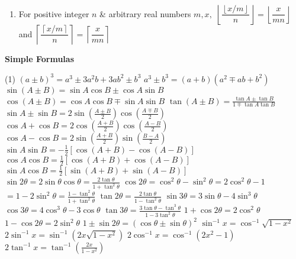 \documentclass[10pt,a4paper,landscape]{article}
\begin{document}
\begin{multicols*}{3}
\begin{enumerate}
			\item For positive integer $n$ \& arbitrary real numbers $m, x,$ \newline $\left \lfloor \dfrac{\left \lfloor x/m \right \rfloor}{n} \right \rfloor = \left \lfloor \dfrac{x}{mn} \right \rfloor$ and $\left \lceil \dfrac{\left \lceil x/m \right \rceil}{n} \right \rceil = \left \lceil \dfrac{x}{mn} \right \rceil$
			
		\end{enumerate}
		
		
		
		\noindent \textbf{Simple Formulas}
		\vspace{-.15 cm}
		\begin{tasks}(1)
			\task $(a \pm b)^3 = a^3 \pm 3a^2b + 3ab^2 \pm b^3$
			\task $a^3 \pm b^3 = (a+b)(a^2 \mp ab + b^2)$
			\task $\sin(A \pm B) = \sin A \cos B \pm \cos A \sin B$
			\task $\cos(A \pm B) = \cos A \cos B \mp \sin A \sin B$
			\task $\tan(A \pm B) = \frac{\tan A \pm \tan B}{1 \mp \tan A \tan B}$
			\task $\sin A \pm \sin B = 2\sin\left(\frac{A \pm B}{2}\right)\cos\left(\frac{A \mp B}{2}\right)$
			\task $\cos A + \cos B = 2\cos\left(\frac{A+B}{2}\right)\cos\left(\frac{A-B}{2}\right)$
			\task $\cos A - \cos B = 2\sin\left(\frac{A+B}{2}\right)\sin\left(\frac{B - A}{2}\right)$
			\task $\sin A \sin B = -\frac{1}{2}[\cos(A+B) - \cos(A-B)]$
			\task $\cos A \cos B = \frac{1}{2}[\cos(A+B) + \cos(A-B)]$
			\task $\sin A \cos B = \frac{1}{2}[\sin(A+B) + \sin(A-B)]$
			\task $\sin 2\theta = 2\sin\theta\cos\theta = \frac{2\tan\theta}{1+\tan^2\theta}$
			\task $\cos 2\theta = \cos^2\theta - \sin^2\theta = 2\cos^2\theta - 1 $\\$= 1 - 2\sin^2\theta = \frac{1-\tan^2\theta}{1+\tan^2\theta}$
			\task $\tan 2\theta = \frac{2\tan\theta}{1-\tan^2\theta}$
			\task $\sin 3\theta = 3\sin\theta - 4\sin^3\theta$
			\task $\cos 3\theta = 4\cos^3\theta - 3\cos\theta$
			\task $\tan 3\theta = \frac{3\tan\theta - \tan^3\theta}{1-3\tan^2\theta}$
			\task $1 + \cos 2\theta = 2\cos^2\theta$
			\task $1 - \cos 2\theta = 2\sin^2\theta$
			\task $1 \pm \sin 2\theta = (\cos\theta \pm \sin\theta)^2$
			\task $\sin^{-1} x = \cos^{-1} \sqrt{1-x^2}$
			\task $2\sin^{-1} x = \sin^{-1}(2x\sqrt{1-x^2})$
			\task $2\cos^{-1} x = \cos^{-1}(2x^2 - 1)$
			\task $2\tan^{-1} x = \tan^{-1}\left(\frac{2x}{1-x^2}\right)$

\end{tasks}
\end{multicols*}
\end{document}
